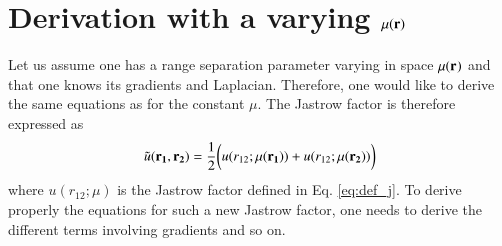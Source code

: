 \documentclass[aip,jcp,reprint,noshowkeys,superscriptaddress]{revtex4-1}
\newcommand{\bd}[1]{{\bf {#1}}}
\newcommand{\mur}[1]{\mu({\bf r_{#1}})}
\begin{document}
\section{Derivation with a varying $\mu({\bf r})$}
Let us assume one has a range separation parameter varying in space $\mur{}$ and that one knows its gradients and Laplacian. 
Therefore, one would like to derive the same equations as for the constant $\mu$. 
The Jastrow factor is therefore expressed as
\begin{equation}
 \tilde{u}(\bd{r_1},\bd{r_2}) = \frac{1}{2}\bigg( u(r_{12};\mur{1}) + u(r_{12};\mur{2}) \bigg)
\end{equation}
where $u(r_{12};\mu)$ is the Jastrow factor defined in Eq. \eqref{eq:def_j}. 
To derive properly the equations for such a new Jastrow factor, one needs to derive the different terms involving gradients and so on. 
\end{document}
